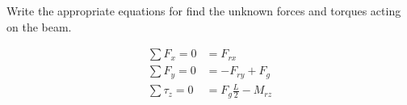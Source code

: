 Write the appropriate equations for find the unknown forces and torques acting on the beam.

\begin{solution}
\begin{align*}
    \sum F_x = 0 &= F_{rx} \\
    \sum F_y = 0 &= -F_{ry} + F_g \\
    \sum \tau_z = 0 &= F_g\frac{L}{2} - M_{rz}
\end{align*}
\end{solution}